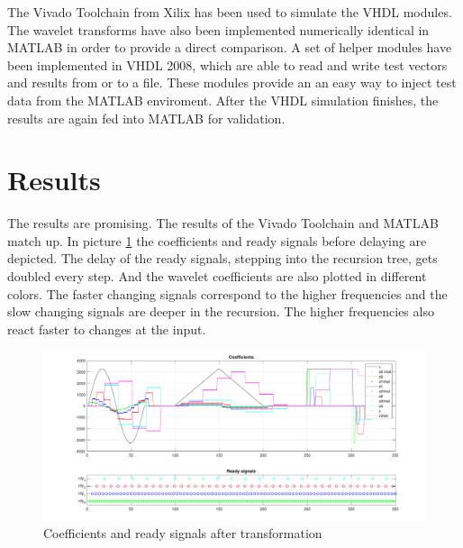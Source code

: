 \begin{refsection}
The Vivado Toolchain from Xilix has been used to simulate the VHDL modules.
The wavelet transforms have also been implemented numerically identical in MATLAB in order to provide a direct comparison. 
A set of helper modules have been implemented in VHDL 2008, which are able to read and write test vectors and results from or to a file.
These modules provide an an easy way to inject test data from the MATLAB enviroment.
After the VHDL simulation finishes, the results are again fed into MATLAB for validation.

\section{Results}

The results are promising. The results of the Vivado Toolchain and MATLAB match up. 
In picture \ref{fpga:fig:coeff} the coefficients and ready signals before delaying are depicted.
The delay of the ready signals, stepping into the recursion tree, gets doubled every step. 
And the wavelet coefficients are also plotted in different colors. 
The faster changing signals correspond to the higher frequencies and the slow changing signals are deeper in the recursion.
The higher frequencies also react faster to changes at the input.
\begin{figure}
	\centering
	\includegraphics[width=\textwidth]{papers/fpga/images/coefs.pdf}
	\caption{Coefficients and ready signals after transformation \label{fpga:fig:coeff}}
\end{figure}


\end{refsection}
